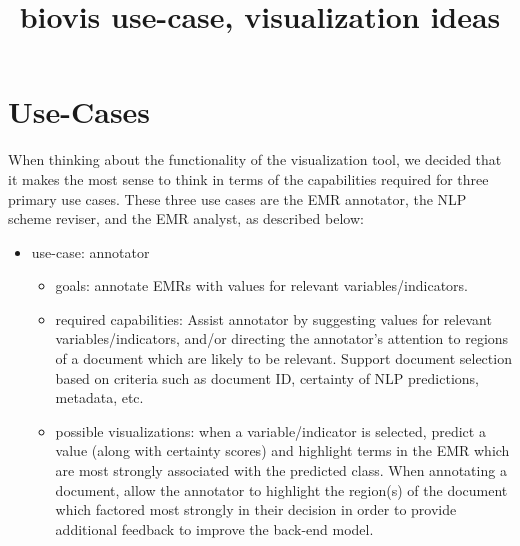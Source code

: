 \documentclass[11pt,letterpaper]{article}
\title{biovis use-case, visualization ideas}
\begin{document}
\maketitle


\section{Use-Cases}\label{sec:use-cases}

When thinking about the functionality of the visualization tool, we decided that it makes the most sense to think in terms of the capabilities required for three primary use cases. These three use cases are the EMR annotator, the NLP scheme reviser, and the EMR analyst, as described below:

\begin{itemize}

\item use-case: annotator
\begin{itemize}
\item goals: annotate EMRs with values for relevant variables/indicators.
\item required capabilities: Assist annotator by suggesting values for relevant variables/indicators, and/or directing the annotator's attention to regions of a document which are likely to be relevant. Support document selection based on criteria such as document ID, certainty of NLP predictions, metadata, etc.
\item possible visualizations: when a variable/indicator is selected, predict a value (along with certainty scores) and highlight terms in the EMR which are most strongly associated with the predicted class. When annotating a document, allow the annotator to highlight the region(s) of the document which factored most strongly in their decision in order to provide additional feedback to improve the back-end model. 
\end{itemize}


\end{itemize}
\end{document}

